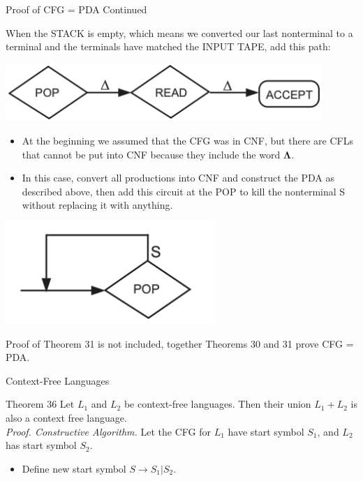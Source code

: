 \documentclass{article}
\begin{document}
\begin{multicols*}{3}
\begin{blackbox}{Proof of CFG = PDA Continued}
\begin{multicols*}{2}
\begin{minipage}{0.45\textwidth}
        When the STACK is empty, which means we converted our last nonterminal to a terminal and the terminals have matched the INPUT TAPE, add this path:
    \end{minipage}
    \end{multicols*}
    \begin{center}
        \includegraphics[width=0.9\textwidth]{th30_4.png}
    \end{center}
\begin{itemize}
    \item At the beginning we assumed that the CFG was in CNF, but there are CFLs that cannot be put into CNF because they include the word $\boldsymbol{\Lambda}$.
    \item In this case, convert all productions into CNF and construct the PDA as described above, then add this circuit at the POP to kill the nonterminal S without replacing it with anything.
\end{itemize}
    \begin{center}
        \includegraphics[width=0.6\textwidth]{th30_5.png}
    \end{center}
    Proof of Theorem 31 is not included, together Theorems 30 and 31 prove CFG = PDA.
\end{blackbox}
\begin{blackbox}{Context-Free Languages}
    \begin{pinkbox}{Theorem 36}
        Let $L_1$ and $L_2$ be context-free languages. Then their union $L_1 + L_2$ is also a context free language.\\
        \textit{Proof. Constructive Algorithm.} Let the CFG for $L_1$ have start symbol $S_1$, and $L_2$ has start symbol $S_2$.
        \begin{itemize}[leftmargin=5pt]
            \item Define new start symbol $S \rightarrow S_1 | S_2$. 

\end{itemize}
\end{pinkbox}
\end{blackbox}
\end{multicols*}
\end{document}
